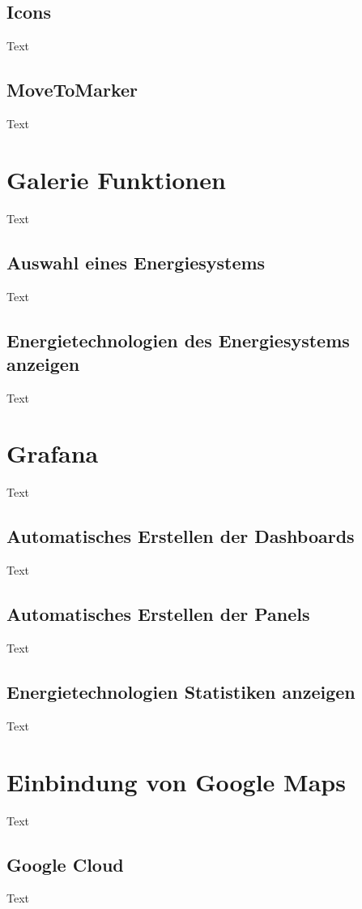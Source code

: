 \subsection{Icons}
Text
\subsection{MoveToMarker}
Text


\section{Galerie Funktionen}
Text
\subsection{Auswahl eines Energiesystems}
Text
\subsection{Energietechnologien des Energiesystems anzeigen}
Text



\section{Grafana}
Text

\subsection{Automatisches Erstellen der Dashboards}
Text

\subsection{Automatisches Erstellen der Panels}
Text

\subsection{Energietechnologien Statistiken anzeigen}
Text



\section{Einbindung von Google Maps}
Text

\subsection{Google Cloud}
Text

